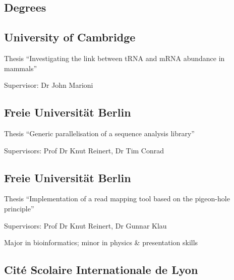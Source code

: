 \documentclass{klmr-cv}
\author{Konrad Rudolph}
\begin{document}
\maketitle

\begin{sidebar}

\section{Degrees}

\subsection{University of Cambridge}

\date{2011--now}
\item{}
\item{Thesis “Investigating the link between tRNA and mRNA abundance in
    mammals”}
\item{Supervisor: Dr John Marioni}

\subsection{Freie Universität Berlin}

\date{2011}
\item{}
\item{Thesis “Generic parallelisation of a sequence analysis library”}
\item{Supervisors: Prof Dr Knut Reinert, Dr Tim Conrad}

\subsection{Freie Universität Berlin}

\date{2008}
\item{}
\item{Thesis “Implementation of a read mapping tool based on the pigeon-hole
    principle”}
\item{Supervisors: Prof Dr Knut Reinert, Dr Gunnar Klau}
\item{Major in bioinformatics; minor in physics \& presentation skills}

\subsection{Cité Scolaire Internationale de Lyon}


\end{sidebar}
\end{document}
